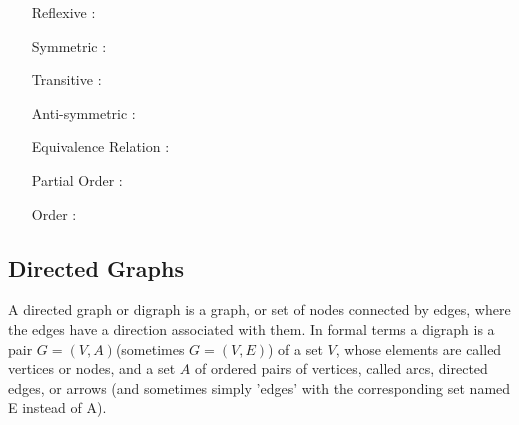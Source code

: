 

\begin{itemize}
\item[Reflexive]: 
\item[Symmetric]: 
\item[Transitive]: 
\item[Anti-symmetric]: 
\item[Equivalence Relation]: 
\item[Partial Order]:
\item[Order]:
\end{itemize}
\newpage
\subsection*{Directed Graphs}
A directed graph or digraph is a graph, or set of nodes connected by edges, where the edges have a direction associated with them. In formal terms a digraph is a pair $G=(V,A)$(sometimes $G=(V,E)$) of a set $V$, whose elements are called vertices or nodes, and a set $A$ of ordered pairs of vertices, called arcs, directed edges, or arrows (and sometimes simply 'edges' with the corresponding set named E instead of A).
